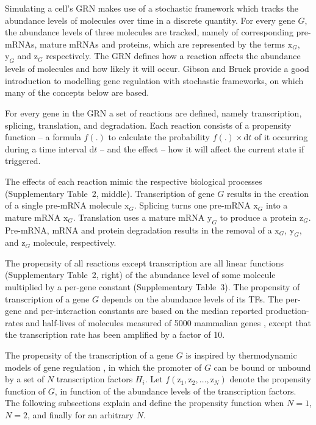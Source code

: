 \documentclass[10pt, a4paper]{article}
\begin{document}
Simulating a cell's GRN makes use of a stochastic framework which tracks
the abundance levels of molecules over time in a discrete quantity. For
every gene \(G\), the abundance levels of three molecules are tracked,
namely of corresponding pre-mRNAs, mature mRNAs and proteins, which are
represented by the terms \(\text{x}_{G}\), \(\text{y}_{G}\) and
\(\text{z}_{G}\) respectively. The GRN defines how a reaction affects
the abundance levels of molecules and how likely it will occur. Gibson
and Bruck \cite{gibson_probabilisticmodelprokaryotic_2000} provide a
good introduction to modelling gene regulation with stochastic
frameworks, on which many of the concepts below are based.

For every gene in the GRN a set of reactions are defined, namely
transcription, splicing, translation, and degradation. Each reaction
consists of a propensity function -- a formula \(f(.)\) to calculate the
probability \(f(.) \times \text{d}t\) of it occurring during a time
interval \(\text{d}t\) -- and the effect -- how it will affect the
current state if triggered.

The effects of each reaction mimic the respective biological processes
(Supplementary Table~2, middle). Transcription of gene \(G\) results in
the creation of a single pre-mRNA molecule \(\text{x}_{G}\). Splicing
turns one pre-mRNA \(\text{x}_{G}\) into a mature mRNA \(\text{x}_{G}\).
Translation uses a mature mRNA \(\text{y}_{G}\) to produce a protein
\(\text{z}_{G}\). Pre-mRNA, mRNA and protein degradation results in the
removal of a \(\text{x}_{G}\), \(\text{y}_{G}\), and \(\text{z}_{G}\)
molecule, respectively.

The propensity of all reactions except transcription are all linear
functions (Supplementary Table~2, right) of the abundance level of some
molecule multiplied by a per-gene constant (Supplementary Table~3). The
propensity of transcription of a gene \(G\) depends on the abundance
levels of its TFs. The per-gene and per-interaction constants are based
on the median reported production-rates and half-lives of molecules
measured of 5000 mammalian genes
\cite{schwanhausser_globalquantificationmammalian_2011}, except that
the transcription rate has been amplified by a factor of 10.

\newcommand{\proptran}{f}
\newcommand{\ai}[2]{$S_{#1} = S_{#2b}$}
\newcommand{\zk}[1]{\frac{y_#1}{k_#1}^{c_#1}}
\newcommand{\wi}[1]{\nu_#1}

The propensity of the transcription of a gene \(G\) is inspired by
thermodynamic models of gene regulation
\cite{schilstra_biologicgeneexpression_2008}, in which the promoter
of \(G\) can be bound or unbound by a set of \(N\) transcription factors
\(H_i\). Let \(f(\text{z}_{1}, \text{z}_{2}, \ldots, \text{z}_{N})\)
denote the propensity function of \(G\), in function of the abundance
levels of the transcription factors. The following subsections explain
and define the propensity function when \(N=1\), \(N=2\), and finally
for an arbitrary \(N\).
\end{document}
